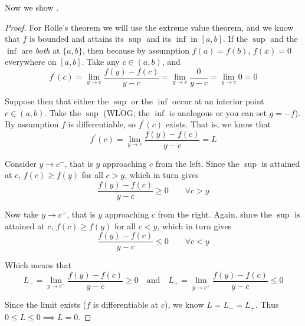 \documentclass{article}
\theoremstyle{mythm}
\theoremstyle{mydef}
\begin{document}
Now we show .
\begin{proof}
    For Rolle's theorem we will use the extreme value theorem, and we know that $f$ is bounded and attains its $\sup$ and its $\inf$ in $[a, b]$. If the $\sup$ and the $\inf$ are \textit{both} at $\{a, b\}$, then because by assumption $f(a) = f(b)$, $f(x) = 0$ everywhere on $[a, b]$. Take any $c \in (a, b)$, and
    \[
        f^\prime(c)
        = \lim_{y \to c} \dfrac{f(y) - f(c)}{y - c}
        = \lim_{y \to c} \dfrac{0}{y - c}
        = \lim_{y \to c} 0 = 0
    \]

    Suppose then that either the $\sup$ or the $\inf$ occur at an interior point $c \in (a, b)$. Take the $\sup$ (WLOG; the $\inf$ is analogous or you can set $g = -f$). By assumption $f$ is differentiable, so $f^\prime(c)$ exists. That is, we know that
    \[
        f^\prime(c)
        = \lim_{y \to c} \dfrac{f(y) - f(c)}{y - c}
        = L
    \]

    Consider $y \to c^-$, that is $y$ approaching $c$ from the left. Since the $\sup$ is attained at $c$, $f(c) \ge f(y)$ for all $c > y$, which in turn gives
    \[
        \dfrac{f(y) - f(c)}{y - c} \ge 0
        \quad\quad
        \forall c > y
    \]

    Now take $y \to c^+$, that is $y$ approaching $c$ from the right. Again, since the $\sup$ is attained at $c$, $f(c) \ge f(y)$ for all $c < y$, which in turn gives
    \[
        \dfrac{f(y) - f(c)}{y - c} \le 0
        \quad\quad
        \forall c < y
    \]

    Which means that
    \[
      L_- = \lim_{y \to c^-} \dfrac{f(y) - f(c)}{y - c} \ge 0
      \quad\text{and}\quad
      L_+ = \lim_{y \to c^+} \dfrac{f(y) - f(c)}{y - c} \le 0
    \]

    Since the limit exists ($f$ is differentiable at $c$), we know $L = L_- = L_+$. Thus $0 \le L \le 0 \implies L = 0$.
\end{proof}
\end{document}
